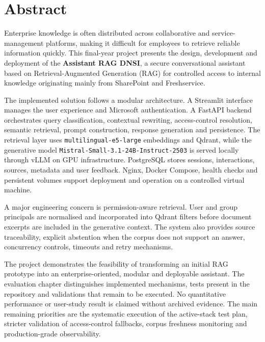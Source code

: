 
\chapter*{Abstract}

Enterprise knowledge is often distributed across collaborative and service-management platforms, making it difficult for employees to retrieve reliable information quickly. This final-year project presents the design, development and deployment of the \textbf{Assistant RAG DNSI}, a secure conversational assistant based on Retrieval-Augmented Generation (RAG) for controlled access to internal knowledge originating mainly from SharePoint and Freshservice.

The implemented solution follows a modular architecture. A Streamlit interface manages the user experience and Microsoft authentication. A FastAPI backend orchestrates query classification, contextual rewriting, access-control resolution, semantic retrieval, prompt construction, response generation and persistence. The retrieval layer uses \texttt{multilingual-e5-large} embeddings and Qdrant, while the generative model \texttt{Mistral-Small-3.1-24B-Instruct-2503} is served locally through vLLM on GPU infrastructure. PostgreSQL stores sessions, interactions, sources, metadata and user feedback. Nginx, Docker Compose, health checks and persistent volumes support deployment and operation on a controlled virtual machine.

A major engineering concern is permission-aware retrieval. User and group principals are normalised and incorporated into Qdrant filters before document excerpts are included in the generative context. The system also provides source traceability, explicit abstention when the corpus does not support an answer, concurrency controls, timeouts and retry mechanisms.

The project demonstrates the feasibility of transforming an initial RAG prototype into an enterprise-oriented, modular and deployable assistant. The evaluation chapter distinguishes implemented mechanisms, tests present in the repository and validations that remain to be executed. No quantitative performance or user-study result is claimed without archived evidence. The main remaining priorities are the systematic execution of the active-stack test plan, stricter validation of access-control fallbacks, corpus freshness monitoring and production-grade observability.


